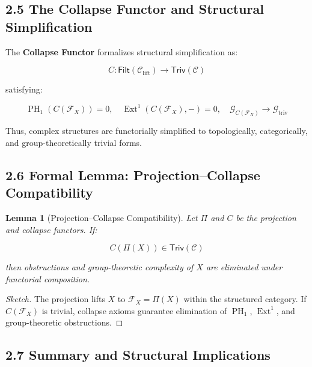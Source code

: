 \documentclass[11pt]{article}
\newtheorem{lemma}[theorem]{Lemma}
\DeclareMathOperator{\Ext}{Ext}
\DeclareMathOperator{\PH}{PH}
\begin{document}
\subsection{2.5 The Collapse Functor and Structural Simplification}

The \textbf{Collapse Functor} formalizes structural simplification as:

\begin{equation}
C : \mathsf{Filt}(\mathcal{C}_{\mathrm{lift}}) \longrightarrow \mathsf{Triv}(\mathcal{C})
\end{equation}

satisfying:

\begin{equation}
\PH_1(C(\mathcal{F}_X)) = 0, \quad \Ext^1(C(\mathcal{F}_X), -) = 0, \quad \mathcal{G}_{C(\mathcal{F}_X)} \longrightarrow \mathcal{G}_{\mathrm{triv}}
\end{equation}

Thus, complex structures are functorially simplified to topologically, categorically, and group-theoretically trivial forms.

\subsection{2.6 Formal Lemma: Projection--Collapse Compatibility}

\begin{lemma}[Projection--Collapse Compatibility]
Let $\Pi$ and $C$ be the projection and collapse functors. If:

\begin{equation}
C(\Pi(X)) \in \mathsf{Triv}(\mathcal{C})
\end{equation}

then obstructions and group-theoretic complexity of $X$ are eliminated under functorial composition.
\end{lemma}

\begin{proof}[Sketch]
The projection lifts $X$ to $\mathcal{F}_X = \Pi(X)$ within the structured category. If $C(\mathcal{F}_X)$ is trivial, collapse axioms guarantee elimination of $\PH_1$, $\Ext^1$, and group-theoretic obstructions.
\end{proof}

\subsection{2.7 Summary and Structural Implications}
\end{document}
